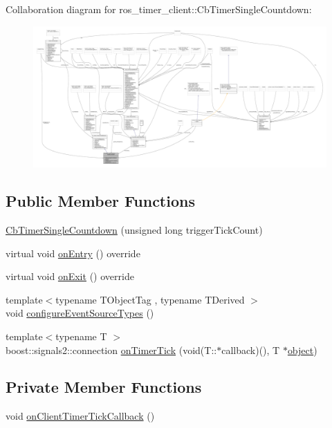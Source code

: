 Collaboration diagram for ros\+\_\+timer\+\_\+client\+:\+:Cb\+Timer\+Single\+Countdown\+:
\nopagebreak
\begin{figure}[H]
\begin{center}
\leavevmode
\includegraphics[width=350pt]{classros__timer__client_1_1CbTimerSingleCountdown__coll__graph}
\end{center}
\end{figure}
\subsection*{Public Member Functions}
\begin{DoxyCompactItemize}
\item 
\hyperlink{classros__timer__client_1_1CbTimerSingleCountdown_ad9f5c0ee2d3c2acc4ff228504b772f13}{Cb\+Timer\+Single\+Countdown} (unsigned long trigger\+Tick\+Count)
\item 
virtual void \hyperlink{classros__timer__client_1_1CbTimerSingleCountdown_aa0b720ca2a29214476f03be27d8c466c}{on\+Entry} () override
\item 
virtual void \hyperlink{classros__timer__client_1_1CbTimerSingleCountdown_a05b5b753c65e4f071670e85e1b7a3302}{on\+Exit} () override
\item 
{\footnotesize template$<$typename T\+Object\+Tag , typename T\+Derived $>$ }\\void \hyperlink{classros__timer__client_1_1CbTimerSingleCountdown_afa7f3000dea0226d2dbb054a18fb9395}{configure\+Event\+Source\+Types} ()
\item 
{\footnotesize template$<$typename T $>$ }\\boost\+::signals2\+::connection \hyperlink{classros__timer__client_1_1CbTimerSingleCountdown_ae280f790ec906a6e095e842a4b05f674}{on\+Timer\+Tick} (void(T\+::$\ast$callback)(), T $\ast$\hyperlink{classobject}{object})
\end{DoxyCompactItemize}
\subsection*{Private Member Functions}
\begin{DoxyCompactItemize}
\item 
void \hyperlink{classros__timer__client_1_1CbTimerSingleCountdown_a348298ef5f6848bcffcd8c3eb059841c}{on\+Client\+Timer\+Tick\+Callback} ()
\end{DoxyCompactItemize}

